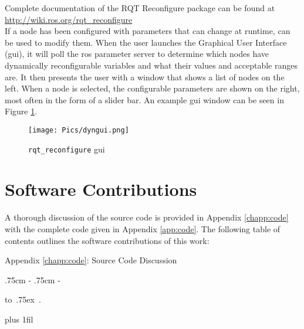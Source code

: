 Complete documentation of the RQT Reconfigure package can be found at \url{http://wiki.ros.org/rqt_reconfigure}\\

If a node has been configured with parameters that can change at runtime,  can be used to modify them. When the user launches the Graphical User Interface (\acrshort{gui}), it will poll the \acrshort{ros} parameter server to determine which nodes have dynamically reconfigurable variables and what their values and acceptable ranges are. It then presents the user with a window that shows a list of nodes on the left. When a node is selected, the configurable parameters are shown on the right, most often in the form of a slider bar. An example  \acrshort{gui} window can be seen in Figure \ref{fig:dyngui2}.

\begin{figure}[h]
    \centering
    \texttt{[image: Pics/dyngui.png]}
    \caption{\texttt{rqt\_reconfigure} \acrshort{gui}}
    \label{fig:dyngui2}
\end{figure}

\section{Software Contributions}
\label{sub:software}

A thorough discussion of the source code is provided in Appendix \ref{chapp:code} with the complete code given in Appendix \ref{app:code}. The following table of contents outlines the software contributions of this work:

\newcommand*{\DotsAndPage}
{\nobreak\leaders\hbox{\normalsize\hbox to .75ex {\hss.\hss}}%
\hfill\nobreak
\makebox[\rightskip][r]{\normalsize \etocpage}\par}

\newcommand*{\NoDotsOrPage}
{\nobreak\leaders\hbox{\normalsize\hbox to .75ex {\hss \hss}}%
\hfill\nobreak
\makebox[\rightskip][r]{\normalsize}\par}
{\parindent 0pt
\nobreak
\etocskipfirstprefix}
{}
{\large\centering
Appendix \ref{chapp:code}: Source Code Discussion\par}
{}
{\leftskip 0pt \rightskip .75cm \parfillskip-\rightskip
\nobreak\medskip
\etocskipfirstprefix}
{\leftskip 0pt \rightskip .75cm \parfillskip-\rightskip
\pagebreak[1]\smallskip}
{\normalsize
\etocname\DotsAndPage }
{\parfillskip 0pt plus 1fil\relax }

